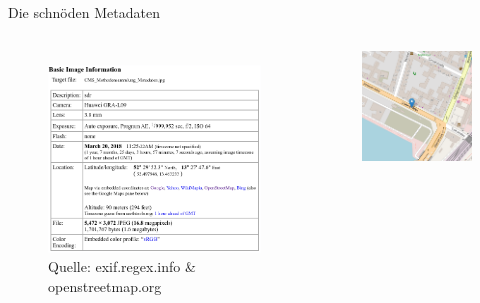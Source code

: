 \documentclass[10pt]{beamer}
\begin{document}
\begin{frame}[fragile]{Die schnöden Metadaten}
\begin{columns}[T,c,onlytextwidth]
	\begin{figure}
		\includegraphics[width=1\textwidth]{images/meta1}
		\tiny Quelle: exif.regex.info \& openstreetmap.org
	\end{figure}
	\begin{figure}
		\includegraphics[width=1\textwidth]{images/meta2}
	\end{figure}
\end{columns}

\end{frame}
\end{document}
